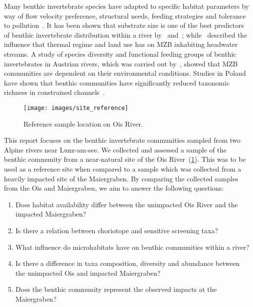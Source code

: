 Many benthic invertebrate species have adapted to specific habitat parameters by way of flow velocity preference, structural needs, feeding strategies and tolerance to pollution~. It has been shown that substrate size is one of the best predictors of benthic invertebrate distribution within a river by~\textcite{Jowett2003} and~\textcite{Schroder2013}; while~\textcite{Dohet2015} described the influence that thermal regime and land use has on MZB inhabiting headwater streams. A study of species diversity and functional feeding groups of benthic invertebrates in Austrian rivers, which was carried out by~, showed that MZB communities are dependent on their environmental conditions. Studies in Poland have shown that benthic communities have significantly reduced taxonomic richness in constrained channels~.

\begin{figure}[!htb]                                                       %
  \center
  \texttt{[image: images/site\_reference]}                 %
  \caption{Reference sample location on Ois River.}                            %
  \label{fig:site_reference}                                                        %
\end{figure}


This report focuses on the benthic invertebrate communities sampled from two Alpine rivers near Lunz-am-see. We collected and assessed a sample of the benthic community from a near-natural site of the Ois River~(\cref{fig:site_reference}). This was to be used as a reference site when compared to a sample which was collected from a heavily impacted site of the Maiergraben. By comparing the collected samples from the Ois and Maiergraben, we aim to answer the following questions:

\singlespacing                                              %
\begin{enumerate}
  \item Does habitat availability differ between the unimpacted Ois River and the impacted Maiergraben?
  \item Is there a relation between choriotope and sensitive screening taxa?
  \item What influence do microhabitats have on benthic communities within a river?
  \item Is there a difference in taxa composition, diversity and abundance between the unimpacted Ois and impacted Maiergraben?
  \item Does the benthic community represent the observed impacts at the Maiergraben?
\end{enumerate}
\onehalfspacing                                             %


